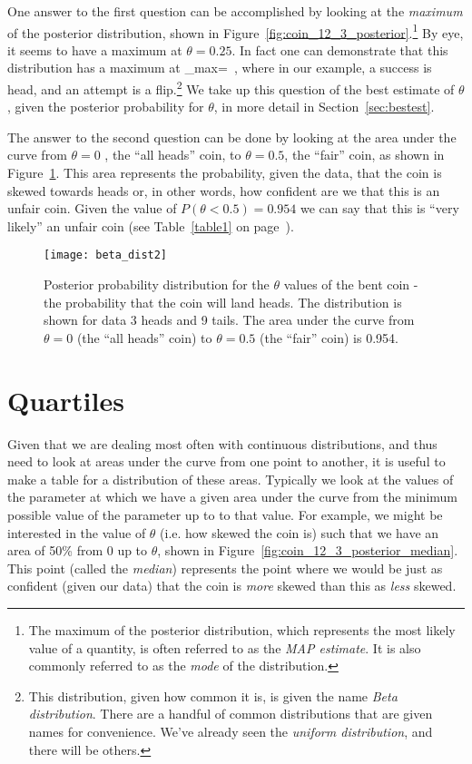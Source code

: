 One answer to the first question can be accomplished by looking at the {\em maximum} of the posterior distribution, shown in Figure~\ref{fig:coin_12_3_posterior}.\footnote{The maximum of the posterior distribution, which represents the most likely value of a quantity, is often referred to as the {\em MAP estimate}.  It is also commonly referred to as the {\em mode} of the distribution.}  By eye, it seems to have a maximum at $\theta=0.25$.  In fact one can demonstrate that this distribution has a maximum at 
\beqn
\theta_{\rm max}= \,,
\eeqn
where in our example, a success is head, and an attempt is a flip.\footnote{This distribution, given how common it is, is given the name {\em Beta distribution}.  There are a handful of common distributions that are given names for convenience.  We've already seen the {\em uniform distribution}, and there will be others.}  We take up this question of the best estimate of $\theta$, given the posterior probability for $\theta$, in more detail in Section~\ref{sec:bestest}.

The answer to the second question can be done by looking at the area under the curve from  $\theta=0$ , the ``all heads'' coin, to $\theta=0.5$, the ``fair'' coin, as shown in Figure~\ref{fig:coin_12_3_posterior_significance}.  This area represents the probability, given the data, that the coin is skewed towards heads or, in other words, how confident are we that this is an unfair coin.  Given the value of $P(\theta<0.5) = 0.954$ we can say that this is ``very likely'' an unfair coin (see Table~\ref{table1} on page~\pageref{table1}). 


\begin{figure}
\texttt{[image: beta\_dist2]}
\caption{Posterior probability distribution for the $\theta$ values of the bent coin - the probability that the coin will land heads.  The distribution is shown for data 3 heads and 9 tails.  The area under the curve from  $\theta=0$ (the ``all heads'' coin) to $\theta=0.5$ (the ``fair'' coin) is 0.954.}
\label{fig:coin_12_3_posterior_significance}
\end{figure}

\section{Quartiles}

Given that we are dealing most often with continuous distributions, and thus need to look at areas under the curve from one point to another, it is useful to make a table for a distribution of these areas.  Typically we look at the values of the parameter at which we have a given area under the curve from the minimum possible value of the parameter up to to that value.  For example, we might be interested in the value of $\theta$ (i.e. how skewed the coin is) such that we have an area of 50\% from 0 up to $\theta$, shown in Figure~\ref{fig:coin_12_3_posterior_median}. This point (called the {\em median}) represents the point where we would be just as confident (given our data) that the coin is {\em more} skewed than this as {\em less} skewed.  

